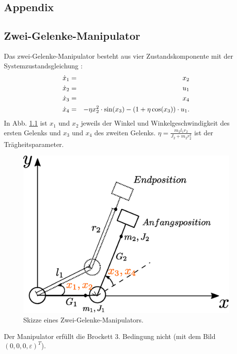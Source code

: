 \begin{appendices}
	\chapter{Appendix}
	\label{sec:Appendix}
	
	\section{Zwei-Gelenke-Manipulator}
	\label{Ausgang_Zwei_Gelenke_Manipulator}
	Das zwei-Gelenke-Manipulator besteht aus vier Zustandskomponente mit der Systemzustandsgleichung \cite{CK}:
	\begin{eqnarray}
		\dot{x}_{1} &=& x_{2}\notag\\
		\dot{x}_{2} &=& u_{1}\notag\\
		\dot{x}_{3} &=& x_{4}\notag\\
		\dot{x}_{4} &=& -\eta x_{2}^2\cdot \sin(x_{3})-(1+\eta \cos(x_{3}))\cdot u_{1}.
		\label{eq:Zwei-Gelenke-Manipulator}
	\end{eqnarray}
	In Abb. \ref{fig:Zwei_Gelenke_Mainipulator} ist $x_{1}$ und $x_{2}$ jeweils der Winkel und Winkelgeschwindigkeit des ersten Gelenks und $x_{3}$ und $x_{4}$ des zweiten Gelenks. $\eta = \frac{m_{2}l_{1}r_{2}}{J_{2}+m_{2}r_{2}^{2}}$ ist der Trägheitsparameter.
	\begin{figure}[!h]
		\centering
		\includegraphics[width=0.5\linewidth]{bild/modul/Unteraktuiertes-System.eps}
		\caption{Skizze eines Zwei-Gelenke-Manipulators.}
		\label{fig:Zwei_Gelenke_Mainipulator}
	\end{figure}
	Der Manipulator erfüllt die Brockett $3.$ Bedingung nicht (mit dem Bild $(0,0,0,\varepsilon)^{T}$).
	

\end{appendices}
